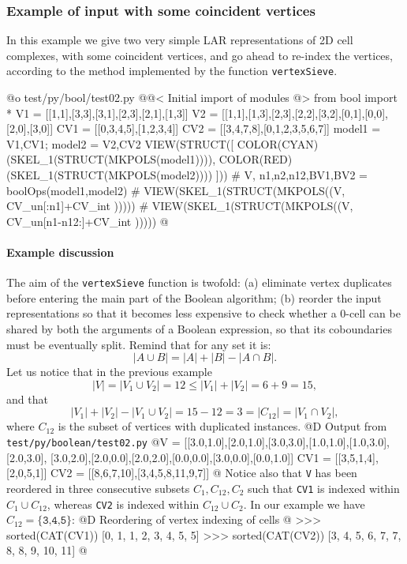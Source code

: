 \documentclass[11pt,oneside]{article}	%
\begin{document}
\subsubsection{Example of input with some coincident vertices}
In this example we give two very simple LAR representations of 2D cell complexes, with some coincident vertices, and go ahead to re-index the vertices, according to the method implemented by the function \texttt{vertexSieve}.

@o test/py/bool/test02.py
@{@< Initial import of modules @>
from bool import *
V1 = [[1,1],[3,3],[3,1],[2,3],[2,1],[1,3]]
V2 = [[1,1],[1,3],[2,3],[2,2],[3,2],[0,1],[0,0],[2,0],[3,0]]
CV1 = [[0,3,4,5],[1,2,3,4]]
CV2 = [[3,4,7,8],[0,1,2,3,5,6,7]]
model1 = V1,CV1; model2 = V2,CV2
VIEW(STRUCT([ 
	COLOR(CYAN)(SKEL_1(STRUCT(MKPOLS(model1)))), 
	COLOR(RED)(SKEL_1(STRUCT(MKPOLS(model2)))) ]))
# V, n1,n2,n12,BV1,BV2 = boolOps(model1,model2)
# VIEW(SKEL_1(STRUCT(MKPOLS((V, CV_un[:n1]+CV_int )))))
# VIEW(SKEL_1(STRUCT(MKPOLS((V, CV_un[n1-n12:]+CV_int )))))
@}

\paragraph{Example discussion} 
The aim of the \texttt{vertexSieve} function is twofold: (a) eliminate vertex duplicates before entering the main part of the Boolean algorithm; (b) reorder the input representations so that it becomes less expensive to check whether a 0-cell can be shared by both the arguments of a Boolean expression, so that its coboundaries must be eventually split. Remind that for any set it is:
\[
|A\cup B| = |A|+|B|-|A\cap B|.
\]
Let us notice that in the previous example
\[
|V| = |V_1 \cup V_2| = 12 \leq |V_1|+|V_2| = 6+9 = 15,
\]
and that 
\[
|V_1|+|V_2| - |V_1 \cup V_2| = 15 - 12 = 3 = |C_{12}| = |V_1 \cap V_2|,
\]
where $C_{12}$ is the subset of vertices with duplicated instances.
@D Output from \texttt{test/py/boolean/test02.py}
@{V   = [[3.0,1.0],[2.0,1.0],[3.0,3.0],[1.0,1.0],[1.0,3.0],[2.0,3.0],
		 [3.0,2.0],[2.0,0.0],[2.0,2.0],[0.0,0.0],[3.0,0.0],[0.0,1.0]]
CV1 = [[3,5,1,4],[2,0,5,1]]
CV2 = [[8,6,7,10],[3,4,5,8,11,9,7]]
@}
Notice also that \texttt{V} has been reordered in three consecutive subsets $C_{1},C_{12},C_{2}$ such that \texttt{CV1} is indexed within $C_{1}\cup C_{12}$, whereas \texttt{CV2} is indexed within $C_{12}\cup C_{2}$. In our example we have  $C_{12}=\{\texttt{3,4,5}\}$: 
@D Reordering of vertex indexing of cells
@{
>>> sorted(CAT(CV1))
[0, 1, 1, 2, 3, 4, 5, 5]
>>> sorted(CAT(CV2))
[3, 4, 5, 6, 7, 7, 8, 8, 9, 10, 11]
@}
\end{document}
